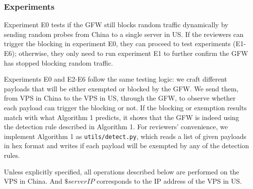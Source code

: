 \subsubsection{Experiments}
Experiment E0 tests if the GFW 
still blocks random traffic dynamically 
by sending random probes from China to a single server in US.
If the reviewers can trigger the blocking in experiment E0,
they can proceed to test experiments (E1-E6);
otherwise,
they only need to run experiment E1 to further confirm the GFW has stopped blocking random traffic.

Experiments E0 and E2-E6 follow the same testing logic:
we craft different payloads that will be either exempted or blocked by the GFW.
We send them, from VPS in China to the VPS in US, through the GFW,
to observe whether each payload can trigger the blocking or not.
If the blocking or exemption results match with
what Algorithm 1 predicts,
it shows that the GFW is indeed using the detection rule described in Algorithm 1.
%
For reviewers' convenience, we implement Algorithm 1 as \texttt{utils/detect.py},
which reads a list of given payloads in hex format and 
writes if each payload will be exempted by any of the detection rules.

Unless explicitly specified, 
all operations described below are performed on the VPS in China.
And $\$serverIP$ corresponds to the IP address of the VPS in US.

